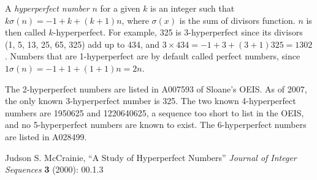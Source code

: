 \documentclass[12pt]{article}
\begin{document}
A {\em hyperperfect number} $n$ for a given $k$ is an integer such that $k \sigma(n) = -1 + k + (k + 1)n$, where $\sigma(x)$ is the sum of divisors function. $n$ is then called $k$-hyperperfect. For example, 325 is 3-hyperperfect since its divisors (1, 5, 13, 25, 65, 325) add up to 434, and $3 \times 434 = -1 + 3 + (3 + 1)325 = 1302$. Numbers that are 1-hyperperfect are by default called perfect numbers, since $1 \sigma(n) = -1 + 1 + (1 + 1)n = 2n$.

The 2-hyperperfect numbers are listed in A007593 of Sloane's OEIS. As of 2007, the only known 3-hyperperfect number is 325. The two known 4-hyperperfect numbers are 1950625 and 1220640625, a sequence too short to list in the OEIS, and no 5-hyperperfect numbers are known to exist. The 6-hyperperfect numbers are listed in A028499.

\begin{thebibliography}{1}
 Judson S. McCrainie, ``A Study of Hyperperfect Numbers'' {\it Journal of Integer Sequences} {\bf 3} (2000): 00.1.3
\end{thebibliography}

\end{document}
